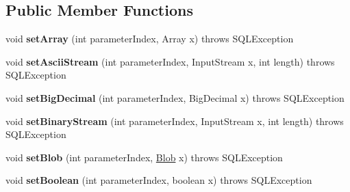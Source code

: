 \subsection*{Public Member Functions}
\begin{DoxyCompactItemize}
\item 
\mbox{\label{classcom_1_1mysql_1_1cj_1_1jdbc_1_1_prepared_statement_wrapper_a8cc6318267fc3fe6820a11923c04538c}} 
void {\bfseries set\+Array} (int parameter\+Index, Array x)  throws S\+Q\+L\+Exception 
\item 
\mbox{\label{classcom_1_1mysql_1_1cj_1_1jdbc_1_1_prepared_statement_wrapper_af7d43540b76d8ea4a86b8841a4e455e5}} 
void {\bfseries set\+Ascii\+Stream} (int parameter\+Index, Input\+Stream x, int length)  throws S\+Q\+L\+Exception 
\item 
\mbox{\label{classcom_1_1mysql_1_1cj_1_1jdbc_1_1_prepared_statement_wrapper_a1c7a22c3777ac3e8655f0fd2fede4d7e}} 
void {\bfseries set\+Big\+Decimal} (int parameter\+Index, Big\+Decimal x)  throws S\+Q\+L\+Exception 
\item 
\mbox{\label{classcom_1_1mysql_1_1cj_1_1jdbc_1_1_prepared_statement_wrapper_a57f7cc239a858005d4148144f1047cc5}} 
void {\bfseries set\+Binary\+Stream} (int parameter\+Index, Input\+Stream x, int length)  throws S\+Q\+L\+Exception 
\item 
\mbox{\label{classcom_1_1mysql_1_1cj_1_1jdbc_1_1_prepared_statement_wrapper_a1ab193ae02d485756815d66713e8eb57}} 
void {\bfseries set\+Blob} (int parameter\+Index, \mbox{\hyperlink{classcom_1_1mysql_1_1cj_1_1jdbc_1_1_blob}{Blob}} x)  throws S\+Q\+L\+Exception 
\item 
\mbox{\label{classcom_1_1mysql_1_1cj_1_1jdbc_1_1_prepared_statement_wrapper_a7bb05bc6788f98b9eda28cc46110fcb3}} 
void {\bfseries set\+Boolean} (int parameter\+Index, boolean x)  throws S\+Q\+L\+Exception 
\item 
\mbox{\label{classcom_1_1mysql_1_1cj_1_1jdbc_1_1_prepared_statement_wrapper_ad9b065cc8c5a1e6ab3f5957c387c982c}} 

\end{DoxyCompactItemize}
